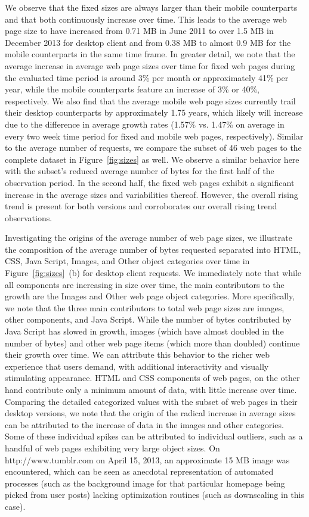 We observe that the fixed sizes are always larger than their mobile counterparts and that both continuously increase over time. 
This leads to the average web page size to have increased from 0.71 MB in June 2011 to over 1.5 MB in December 2013 for desktop client and from 0.38 MB to almost 0.9 MB for the mobile counterparts in the same time frame.
In greater detail, we note that the average increase in average web page sizes over time for fixed web pages during the evaluated time period is around 3\% per month or approximately 41\% per year, while the mobile counterparts feature an increase of 3\% or 40\%, respectively.
We also find that the average mobile web page sizes currently trail their desktop counterparts by approximately 1.75 years, which likely will increase due to the difference in average growth rates (1.57\% vs. 1.47\% on average in every two week time period for fixed and mobile web pages, respectively).
Similar to the average number of requests, we compare the subset of 46 web pages to the complete dataset in Figure~\ref{fig:sizes} as well.
We observe a similar behavior here with the subset's reduced average number of bytes for the first half of the observation period. In the second half, the fixed web pages exhibit a significant increase in the average sizes and variabilities thereof. 
However, the overall rising trend is present for both versions and corroborates our overall rising trend observations.

Investigating the origins of the average number of web page sizes, we illustrate the composition of the average number of bytes requested separated into HTML, CSS, Java Script, Images, and Other object categories over time in Figure~\ref{fig:sizes}~(b) for desktop client requests.
We immediately note that while all components are increasing in size over time, the main contributors to the growth are the Images and Other web page object categories.
More specifically, we note that the three main contributors to total web page sizes are images, other components, and Java Script. 
While the number of bytes contributed by Java Script has slowed in growth, images (which have almost doubled in the number of bytes) and other web page items (which more than doubled) continue their growth over time.
We can attribute this behavior to the richer web experience that users demand, with additional interactivity and visually stimulating appearance.
HTML and CSS components of web pages, on the other hand contribute only a minimum amount of data, with little increase over time.
Comparing the detailed categorized values with the subset of web pages in their desktop versions, we note that the origin of the radical increase in average sizes can be attributed to the increase of data in the images and other categories.
Some of these individual spikes can be attributed to individual outliers, such as a handful of web pages exhibiting very large object sizes. On http://www.tumblr.com on April 15, 2013, an approximate 15 MB image was encountered, which can be seen as anecdotal representation of automated processes (such as the background image for that particular homepage being picked from user posts) lacking optimization routines (such as downscaling in this case).


